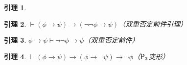 \documentclass[punct=custom/kaiming,fontset=none]{ctexart}
\makeatletter
\renewenvironment{proof}[1][\proofname]{\par
  \pushQED{\qed}%
  \normalfont \topsep6\p@\@plus6\p@\relax
  \trivlist
  \item[\hskip\labelsep
    \bfseries
    #1%
    ]\ignorespaces
}{%
  \popQED\endtrivlist\@endpefalse
}
\newtheorem*{lemma*}{引理}
\let\proves\vdash
\makeatother
\begin{document}
\begin{description}
\begin{lemma*}
\begin{proof}
      \begin{ND}
        \label{1}
        \label{2}
        \label{3}
      \end{ND}
    \end{proof}
  \end{lemma*}
  \begin{lemma*}
    \label{lem:dnIntroAnte}
    \(\proves (\phi \to \psi) \to (\neg\neg\phi \to \psi)\)\hfill（双重否定前件引理）
    \begin{proof}
      \leavevmode
      \begin{ND}
        \label{1}
        \label{2}
        \label{3}
        \label{4}
        \label{5}
      \end{ND}
    \end{proof}
  \end{lemma*}
  \begin{lemma*}
    \label{ded:dnIntroAnte}
    \(\phi \to \psi \proves \neg\neg\phi \to \psi\)\hfill（双重否定前件）
    \begin{proof}
      \leavevmode
      \begin{ND}
        \label{1}
        \label{2}
      \end{ND}
    \end{proof}
  \end{lemma*}
  \begin{lemma*}
    \label{lem:p3var}
    \(\proves (\phi \to \psi) \to (\phi \to \neg\psi) \to \neg\phi\)\hfill（\(\rm P_3\)变形）

\end{lemma*}
\end{description}
\end{document}
